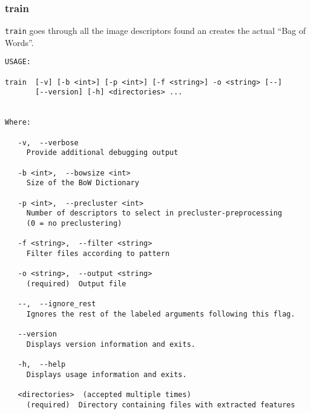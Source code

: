 \subsubsection{train}

\texttt{train} goes through all the image descriptors found an creates the
actual ``Bag of Words''. 

\begin{verbatim}
USAGE: 

train  [-v] [-b <int>] [-p <int>] [-f <string>] -o <string> [--]
       [--version] [-h] <directories> ...


Where: 

   -v,  --verbose
     Provide additional debugging output

   -b <int>,  --bowsize <int>
     Size of the BoW Dictionary

   -p <int>,  --precluster <int>
     Number of descriptors to select in precluster-preprocessing 
	 (0 = no preclustering)

   -f <string>,  --filter <string>
     Filter files according to pattern

   -o <string>,  --output <string>
     (required)  Output file

   --,  --ignore_rest
     Ignores the rest of the labeled arguments following this flag.

   --version
     Displays version information and exits.

   -h,  --help
     Displays usage information and exits.

   <directories>  (accepted multiple times)
     (required)  Directory containing files with extracted features
\end{verbatim}
